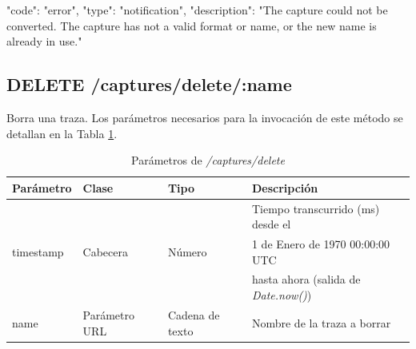 \begin{itemize}
{\begin{minipage}{\textwidth}
\begin{code}[language=json]
{
  "code": "error",
  "type": "notification",
  "description": "The capture could not be converted. The capture has not a valid format or name, or the new name is already in use."
}
\end{code}
\end{minipage}
}
\end{itemize}

%
%
\subsection{DELETE /captures/delete/:name}
Borra una \gls{traza}. Los parámetros necesarios para la invocación de este método se detallan en la Tabla \ref{extra:api:capturesdelete:invocacion}.

\begin{table}[H]
\centering
\begin{tabular}{|l|l|l|l|}
\hline
\rowcolor[HTML]{F5F5F5}
\textbf{Parámetro}  & \textbf{Clase} & \textbf{Tipo}   & \textbf{Descripción}                        \\ \hline
                    &                &                 & Tiempo transcurrido (ms) desde el           \\
timestamp           & Cabecera       & Número          & 1 de Enero de 1970 00:00:00 UTC             \\
                    &                &                 & hasta ahora (salida de \textit{Date.now()}) \\ \hline
name                & Parámetro URL  & Cadena de texto & Nombre de la \gls{traza} a borrar           \\ \hline
\end{tabular}
\caption{Parámetros de \textit{/captures/delete}}
\label{extra:api:capturesdelete:invocacion}
\end{table}

